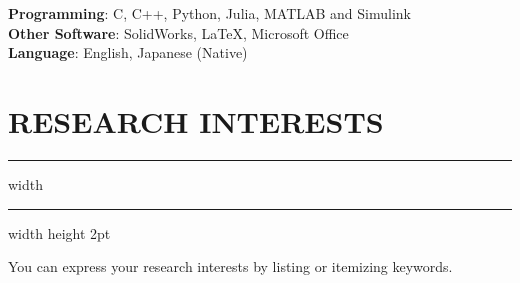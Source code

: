 \documentclass[12pt]{article}
\begin{document}
		\textbf{Programming}: C, C++, Python, Julia, MATLAB and Simulink\\
		\textbf{Other Software}: SolidWorks, LaTeX, Microsoft Office\\
		\textbf{Language}: English, Japanese (Native)\\

	\vspace{-4mm}
	\section*{\textbf{\Large R}\normalsize ESEARCH {\Large I}\normalsize NTERESTS}
	\vspace{-2mm}
	\hrule width \hsize \kern 1mm \hrule width \hsize height 2pt
	\vspace{2mm}

		\begin{flushleft}
			You can express your research interests by listing or itemizing keywords.
		\end{flushleft}
	
	\vspace{-4mm}
\end{document}

